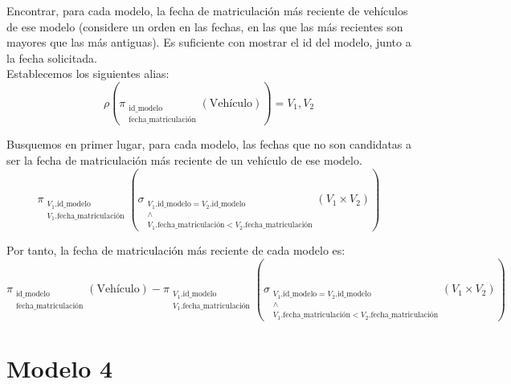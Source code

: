 \documentclass[12pt]{article}
\begin{document}
\begin{ejercicio}[AR]
    Encontrar, para cada modelo, la fecha de matriculación más reciente de vehículos de ese modelo (considere un orden en las fechas, en las que las más recientes son mayores que las más antiguas). Es suficiente con mostrar el id del modelo, junto a la fecha solicitada.\\

    Establecemos los siguientes alias:
    \begin{equation*}
        \rho\left(\pi_{\substack{\text{id\_modelo}\\\text{fecha\_matriculación}}}\left(\text{Vehículo}\right)\right)=V_1,V_2
    \end{equation*}

    Busquemos en primer lugar, para cada modelo, las fechas que no son candidatas a ser la fecha de matriculación más reciente de un vehículo de ese modelo.
    \begin{equation*}
        \pi_{\substack{V_1.\text{id\_modelo}\\V_1.\text{fecha\_matriculación}}}\left(\sigma_{\substack{V_1.\text{id\_modelo}=V_2.\text{id\_modelo}\\\land\\V_1.\text{fecha\_matriculación}<V_2.\text{fecha\_matriculación}}}(V_1\times V_2)\right)
    \end{equation*}

    Por tanto, la fecha de matriculación más reciente de cada modelo es:
    \begin{equation*}
        \pi_{\substack{\text{id\_modelo}\\\text{fecha\_matriculación}}}\left(\text{Vehículo}\right)
        -
        \pi_{\substack{V_1.\text{id\_modelo}\\V_1.\text{fecha\_matriculación}}}\left(\sigma_{\substack{V_1.\text{id\_modelo}=V_2.\text{id\_modelo}\\\land\\V_1.\text{fecha\_matriculación}<V_2.\text{fecha\_matriculación}}}(V_1\times V_2)\right)
    \end{equation*}
\end{ejercicio}


\newpage
\section{Modelo 4}\label{sec:modelo4}
\end{document}
